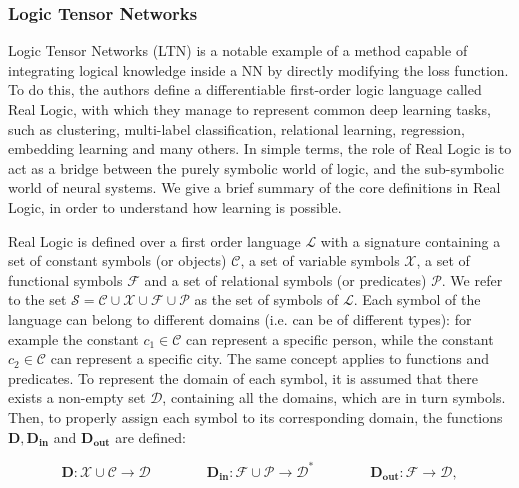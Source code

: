  \subsubsection{Logic Tensor Networks}
 Logic Tensor Networks (LTN) \cite{serafini2016logic} is a notable example of a method capable of integrating logical knowledge inside a NN by directly modifying the loss function. To do this, the authors define a differentiable first-order logic language called Real Logic, with which they manage to represent common deep learning tasks, such as clustering, multi-label classification, relational learning, regression, embedding learning and many others. 
 In simple terms, the role of Real Logic is to act as a bridge between the purely symbolic world of logic, and the sub-symbolic world of neural systems. We give a brief summary of the core definitions in Real Logic, in order to understand how learning is possible.
 
 Real Logic is defined over a first order language $\mathcal{L}$ with a signature containing a set of constant symbols (or objects) $\mathcal{C}$, a set of variable symbols $\mathcal{X}$, a set of functional symbols $\mathcal{F}$ and a set of relational symbols (or predicates) $\mathcal{P}$. We refer to the set $\mathcal{S} = \mathcal{C} \cup \mathcal{X} \cup \mathcal{F} \cup  \mathcal{P}$ as the set of symbols of $\mathcal{L}$. Each symbol of the language can belong to different domains (i.e. can be of different types): for example the constant $c_1 \in \mathcal{C}$ can represent a specific person, while the constant $c_2 \in \mathcal{C}$ can represent a specific city. The same concept applies to functions and predicates. To represent the domain of each symbol, it is assumed that there exists a non-empty set $\mathcal{D}$, containing all the domains, which are in turn symbols. Then, to properly assign each symbol to its corresponding domain, the functions $\mathbf{D}, \mathbf{D_{in}}$ and $\mathbf{D_{out}}$ are defined:
 
 \begin{equation*}
 \mathbf{D}: \mathcal{X} \cup \mathcal{C} \rightarrow\mathcal{D}
 \qquad \qquad
 \mathbf{D_{in}}: \mathcal{F} \cup \mathcal{P} \rightarrow\mathcal{D^*}
 \qquad \qquad 
 \mathbf{D_{out}}: \mathcal{F} \rightarrow\mathcal{D},
 \end{equation*}
 
